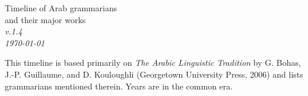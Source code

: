 \documentclass[a4paper,landscape]{article}
\begin{document}
\thispagestyle{empty}

\begin{minipage}[t]{.4\textwidth}
{\LARGE Timeline of Arab grammarians\\and their major works}\\[\medskipamount]
\textit{v.1.4\\\today}
\end{minipage}
\hfill
\begin{minipage}[t]{.38\textwidth}
This timeline is based primarily on \textit{The Arabic Linguistic Tradition} by G. Bohas, \mbox{J.-P.} Guillaume, and D. Kouloughli (Georgetown University Press, 2006) and lists grammarians mentioned therein. Years are in the common era.
\end{minipage}


\vfill
\end{document}
